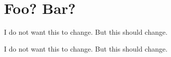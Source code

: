 \section{Foo?
  Bar?
 }

I do not want this to change.
But this should change.

I do not want this to change.
But this should change.
